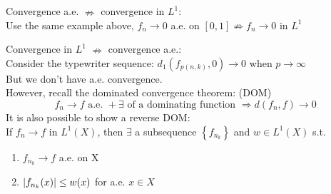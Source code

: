 Convergence a.e. \(\nRightarrow\) convergence in \(L^1\): \\
Use the same example above, \(f_n \rightarrow 0\) a.e. on \([0, 1] \nRightarrow f_n \rightarrow 0\) in \(L^1\)

Convergence in \(L^1\) \(\nRightarrow\) convergence a.e.: \\
Consider the typewriter sequence: \( d_1(f_{p(n, k)}, 0) \to 0\) when \( p \to\infty\) \\
But we don't have a.e. convergence. \\
However, recall the dominated convergence theorem: (DOM)
\[ 
    f_n \rightarrow f \text{ a.e. } + \exists \text{ of a dominating function } \Rightarrow d(f_n, f)\rightarrow 0 
\]
It is also possible to show a reverse DOM: \\
If \(f_n \to f \) in \(L^1(X)\), then \(\exists\) a subsequence \(\left\{f_{n_k}\right\}\) and \(w \in L^1(X)\) s.t. 
\begin{enumerate}
    \item \(f_{n_k} \rightarrow f\) a.e. on X
    \item \( \abs{f_{n_k}(x)} \leq w(x) \) for a.e. \(x \in X\)
\end{enumerate}